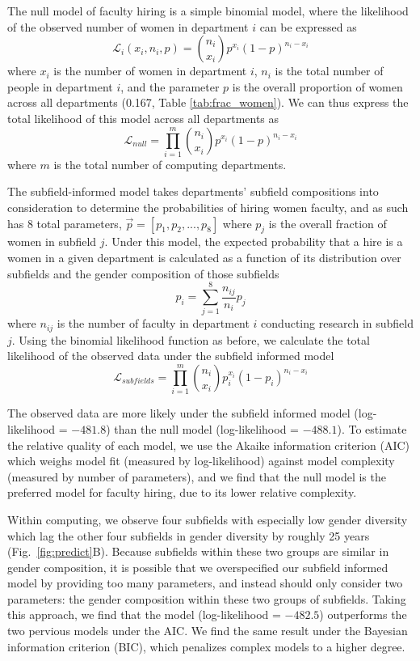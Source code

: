 \documentclass[reprint, twocolumn, aps, nofootinbib, superscriptaddress, longbibliography]{revtex4-1}
\begin{document}
The null model of faculty hiring is a simple binomial model, where the likelihood of the observed number of women in department $i$ can be expressed as 
$$\mathcal{L}_i(x_i, n_i, p) = \binom{n_i}{x_i}p^{x_i}(1-p)^{n_i-x_i}$$ 
where $x_i$ is the number of women in department $i$, $n_i$ is the total number of people in department $i$, and the parameter $p$ is the overall proportion of women across all departments (0.167, Table \ref{tab:frac_women}). We can thus express the total likelihood of this model across all departments as 
$$\mathcal{L}_{null} =\prod_{i=1}^m \binom{n_i}{x_i}p^{x_i}(1-p)^{n_i-x_i}$$ 
where $m$ is the total number of computing departments. 

The subfield-informed model takes departments' subfield compositions into consideration to determine the probabilities of hiring women faculty, and as such has 8 total parameters, $\vec{p} = [p_1, p_2, ..., p_8]$ where $p_j$ is the overall fraction of women in subfield $j$. Under this model, the expected probability that a hire is a women in a given department is calculated as a function of its distribution over subfields and the gender composition of those subfields 
$$p_i = \sum_{j=1}^8\frac{n_{ij}}{n_i}p_j$$ 
where $n_{ij}$ is the number of faculty in department $i$ conducting research in subfield $j$. Using the binomial likelihood function as before, we calculate the total likelihood of the observed data under the subfield informed model 
$$\mathcal{L}_{subfields} =\prod_{i=1}^m \binom{n_i}{x_i}p_i^{x_i}(1-p_i)^{n_i-x_i}$$ 

The observed data are more likely under the subfield informed model (log-likelihood = $-481.8$) than the null model (log-likelihood = $-488.1$). To estimate the relative quality of each model, we use the Akaike information criterion (AIC) which weighs model fit (measured by log-likelihood) against model complexity (measured by number of parameters), and we find that the null model is the preferred model for faculty hiring, due to its lower relative complexity. 

Within computing, we observe four subfields with especially low gender diversity which lag the other four subfields in gender diversity by roughly 25 years (Fig.~\ref{fig:predict}B). Because subfields within these two groups are similar in gender composition, it is possible that we overspecified our subfield informed model by providing too many parameters, and instead should only consider two parameters: the gender composition within these two groups of subfields. Taking this approach, we find that the model (log-likelihood = $-482.5$) outperforms the two pervious models under the AIC. We find the same result under the Bayesian information criterion (BIC), which penalizes complex models to a higher degree. 
\end{document}
